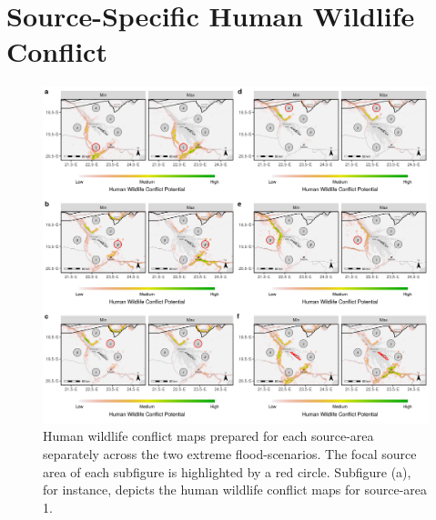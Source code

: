 \documentclass[abstract=on,10pt,a4paper,bibliography=totocnumbered]{article}
\begin{document}
\section{Source-Specific Human Wildlife Conflict}
\begin{figure}[htbp]
  \begin{center}
  \includegraphics[width = \textwidth]{99_HumanWildlifeConflictIndividual.png}
  \caption{Human wildlife conflict maps prepared for each source-area separately
  across the two extreme flood-scenarios. The focal source area of each
  subfigure is highlighted by a red circle. Subfigure (a), for instance, depicts
  the human wildlife conflict maps for source-area 1.}
  \label{HWC}
  \end{center}
\end{figure}

\newpage
\begingroup
\singlespacing

\endgroup
\end{document}
